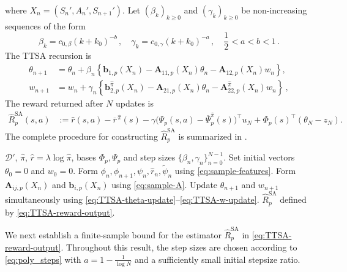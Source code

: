 \documentclass{article}
\theoremstyle{definition}
\theoremstyle{remark}
\theoremstyle{plain}
\def\eqsp{\,}
\newcommand{\dsieve}{p}
\def\funcbw{\mathbf{b}}
\def\funcAw{\mathbf{A}}
\numberwithin{equation}{section}
\begin{document}
where \(X_n = (S_n', A_n', S_{n+1}').\)
Let $(\beta_k)_{k \geq 0}$ and $(\gamma_k)_{k \geq 0}$ be non-increasing sequences of the form 
\begin{equation}
\label{eq:poly_steps}
\beta_k = c_{0, \beta} (k+k_0)^{-b}\eqsp,\quad\gamma_k = c_{0, \gamma} (k+k_0)^{-a} \eqsp, \quad \frac{1}{2} < a < b < 1\eqsp.
\end{equation}
The  TTSA recursion is
\begin{align}
\label{eq:TTSA-theta-update}
    \theta_{n+1}
    &=
    \theta_n
    +
    \beta_n
    \left\{
        \funcbw_{1,\dsieve}(X_n)
        -
        \funcAw_{11,\dsieve}(X_n)\theta_n
        -
        \funcAw_{12,\dsieve}(X_n)w_n
    \right\},
    \\
\label{eq:TTSA-w-update}
    w_{n+1}
    &=
    w_n
    +
    \gamma_n
    \left\{
        \funcbw_{2,\dsieve}^{\widehat\pi}(X_n)
        -
        \funcAw_{21,\dsieve}(X_n)\theta_n
        -
        \funcAw_{22,\dsieve}^{\widehat\pi}(X_n)w_n
    \right\}\eqsp,
\end{align}
The reward returned after \(N\) updates is
\begin{align}
\label{eq:TTSA-reward-output}
    \widehat R_{\dsieve}^{\mathrm{SA}}(s,a)
    &:=
    \widehat r(s,a)-\overline{r}^{\,\widehat\pi}(s)
    -
    \gamma
    \bigl(
        \Psi_\dsieve (s,a)-\overline\Psi_\dsieve^{\widehat\pi}(s)
    \bigr)^\top u_{N}
    +
    \Phi_\dsieve(s)^\top(\theta_{N}-z_{N}).
\end{align}
The complete procedure for constructing
\(\widehat R_{\dsieve}^{\mathrm{SA}}\) is summarized in
.
\begin{algorithm}[H]
\caption{Two-timescale estimation of the Galerkin Bellman projection}
\label{alg:ttsa}
\begin{algorithmic}[1]
\Require \(\mathcal D'\), \(\widehat\pi\), \(\widehat r=\lambda\log\widehat\pi\), bases \(\Phi_\dsieve,\Psi_\dsieve\) and step sizes \(\{\beta_n,\gamma_n\}_{n=0}^{N-1}\).
\State Set initial vectors \(\theta_0=0\) and \(w_0 =0 \).
    \State Form \(\phi_n,\phi_{n+1},\psi_n,\widehat r_n,\widetilde\psi_n\) using \eqref{eq:sample-features}.
    \State Form \(\funcAw_{ij,\dsieve}(X_n)\) and \(\funcbw_{i,\dsieve}(X_n)\) using \eqref{eq:sample-A}.
    \State Update \(\theta_{n+1}\) and \(w_{n+1}\) simultaneously using \eqref{eq:TTSA-theta-update}--\eqref{eq:TTSA-w-update}.
\EndFor
\State \Return \(\widehat R_{\dsieve}^{\mathrm{SA}}\) defined by \eqref{eq:TTSA-reward-output}.
\end{algorithmic}
\end{algorithm}
We next establish a finite-sample bound for the estimator
\(\widehat R_{\dsieve}^{\mathrm{SA}}\) in \eqref{eq:TTSA-reward-output}.
Throughout this result, the step sizes are chosen according to
\eqref{eq:poly_steps} with \(a=1-\frac{1}{\log N}\) and a sufficiently small
initial stepsize ratio.
\end{document}
